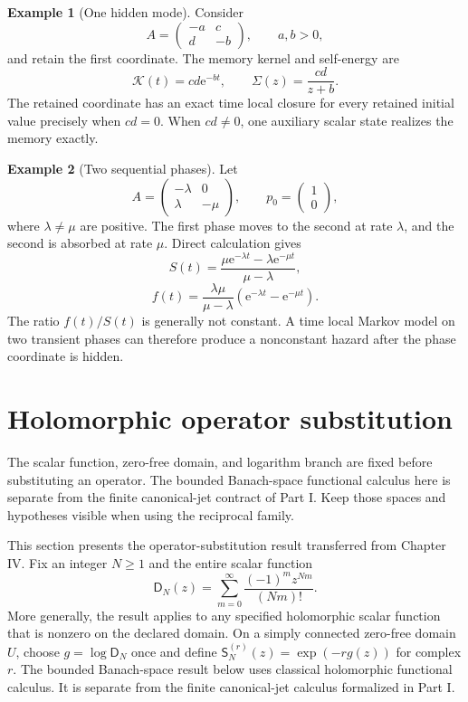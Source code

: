 \documentclass[11pt,letterpaper]{article}
\theoremstyle{plain}
\theoremstyle{plain}
\theoremstyle{plain}
\theoremstyle{definition}
\theoremstyle{definition}
\theoremstyle{definition}
\newtheorem{example}[example]{Example}
\theoremstyle{definition}
\theoremstyle{definition}
\theoremstyle{remark}
\theoremstyle{remark}
\theoremstyle{remark}
\theoremstyle{remark}
\theoremstyle{remark}
\theoremstyle{remark}
\newcommand{\Dfun}{\mathsf D}
\newcommand{\Sfun}{\mathsf S}
\newcommand{\Kcal}{\mathcal K}
\newcommand{\e}{\mathrm e}
\let\KomorebiPrimitiveMathcal\mathcal
\renewcommand{\mathcal}[1]{{\KomorebiPrimitiveMathcal{#1}}}
\let\KomorebiPrimitivemathsf\mathsf
\renewcommand{\mathsf}[1]{{\KomorebiPrimitivemathsf{#1}}}
\let\KomorebiPrimitivemathrm\mathrm
\renewcommand{\mathrm}[1]{{\KomorebiPrimitivemathrm{#1}}}
\begin{document}
\begin{example}[One hidden mode]\label{earlier:record:029}\label{earlier:ex:one_hidden_mode}
Consider
\[
A=
\begin{pmatrix}
-a&c\\
d&-b
\end{pmatrix},
\qquad
a,b>0,
\]
and retain the first coordinate. The memory kernel and self-energy are
\[
\Kcal(t)=cd\e^{-bt},
\qquad
\Sigma(z)=\frac{cd}{z+b}.
\]
The retained coordinate has an exact time local closure for every retained initial value precisely when \(cd=0\). When \(cd\neq0\), one auxiliary scalar state realizes the memory exactly.
\end{example}

\begin{example}[Two sequential phases]\label{earlier:record:030}\label{earlier:ex:two_phase_survival}
Let
\[
A=
\begin{pmatrix}
-\lambda&0\\
\lambda&-\mu
\end{pmatrix},
\qquad
p_0=
\begin{pmatrix}1\\0\end{pmatrix},
\]
where \(\lambda\neq\mu\) are positive. The first phase moves to the second at rate \(\lambda\), and the second is absorbed at rate \(\mu\). Direct calculation gives
\[
S(t)=
\frac{\mu\e^{-\lambda t}-\lambda\e^{-\mu t}}{\mu-\lambda},
\]
\[
f(t)=
\frac{\lambda\mu}{\mu-\lambda}
\left(\e^{-\lambda t}-\e^{-\mu t}\right).
\]
The ratio \(f(t)/S(t)\) is generally not constant. A time local Markov model on two transient phases can therefore produce a nonconstant hazard after the phase coordinate is hidden.
\end{example}

\FloatBarrier
\section{Holomorphic operator substitution}\label{migration:section:01}\label{migration:sec:operator_substitution}
\begin{readerroadmap}
The scalar function, zero-free domain, and logarithm branch are fixed before substituting an operator. The bounded Banach-space functional calculus here is separate from the finite canonical-jet contract of Part I. Keep those spaces and hypotheses visible when using the reciprocal family.
\end{readerroadmap}


This section presents the operator-substitution result transferred from Chapter IV. Fix an integer $N\geq1$ and the entire scalar function
\[
\Dfun_N(z)=\sum_{m=0}^{\infty}\frac{(-1)^m z^{Nm}}{(Nm)!}.
\]
More generally, the result applies to any specified holomorphic scalar function that is nonzero on the declared domain. On a simply connected zero-free domain $U$, choose $g=\log\Dfun_N$ once and define $\Sfun_N^{(r)}(z)=\exp(-r g(z))$ for complex $r$. The bounded Banach-space result below uses classical holomorphic functional calculus. It is separate from the finite canonical-jet calculus formalized in Part I.
\end{document}
